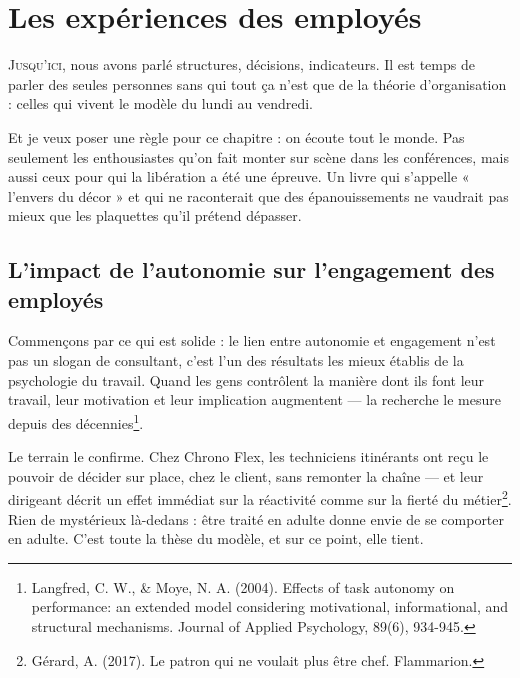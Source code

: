 
\chapter{Les expériences des employés}

\lettrine[lines=2]{J}{usqu'ici}, nous avons parlé structures, décisions, indicateurs. Il est temps de parler des seules personnes sans qui tout ça n'est que de la théorie d'organisation : celles qui vivent le modèle du lundi au vendredi.

Et je veux poser une règle pour ce chapitre : on écoute tout le monde. Pas seulement les enthousiastes qu'on fait monter sur scène dans les conférences, mais aussi ceux pour qui la libération a été une épreuve. Un livre qui s'appelle « l'envers du décor » et qui ne raconterait que des épanouissements ne vaudrait pas mieux que les plaquettes qu'il prétend dépasser.

\section{L'impact de l'autonomie sur l'engagement des employés}

Commençons par ce qui est solide : le lien entre autonomie et engagement n'est pas un slogan de consultant, c'est l'un des résultats les mieux établis de la psychologie du travail. Quand les gens contrôlent la manière dont ils font leur travail, leur motivation et leur implication augmentent — la recherche le mesure depuis des décennies\footnote{Langfred, C. W., \& Moye, N. A. (2004). Effects of task autonomy on performance: an extended model considering motivational, informational, and structural mechanisms. Journal of Applied Psychology, 89(6), 934-945.}.

Le terrain le confirme. Chez Chrono Flex, les techniciens itinérants ont reçu le pouvoir de décider sur place, chez le client, sans remonter la chaîne — et leur dirigeant décrit un effet immédiat sur la réactivité comme sur la fierté du métier\footnote{Gérard, A. (2017). Le patron qui ne voulait plus être chef. Flammarion.}. Rien de mystérieux là-dedans : être traité en adulte donne envie de se comporter en adulte. C'est toute la thèse du modèle, et sur ce point, elle tient.

